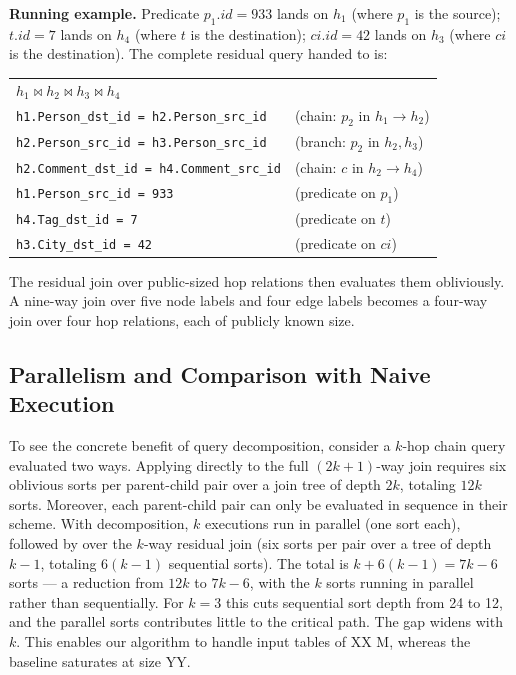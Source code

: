 \noindent\textbf{Running example.} Predicate $p_1.\mathit{id}=933$ lands
on $h_1$ (where $p_1$ is the source); $t.\mathit{id}=7$ lands on $h_4$
(where $t$ is the destination); $\mathit{ci}.\mathit{id}=42$ lands on
$h_3$ (where $\mathit{ci}$ is the destination). The complete residual
query handed to \wei is:
\begin{center}
\small
\begin{tabular}{@{}ll@{}}
$h_1 \bowtie h_2 \bowtie h_3 \bowtie h_4$ & \\[4pt]
\texttt{h1.Person\_dst\_id = h2.Person\_src\_id} & (chain: $p_2$ in $h_1{\to}h_2$)\\
\texttt{h2.Person\_src\_id = h3.Person\_src\_id} & (branch: $p_2$ in $h_2, h_3$)\\
\texttt{h2.Comment\_dst\_id = h4.Comment\_src\_id} & (chain: $c$ in $h_2{\to}h_4$)\\[4pt]
\texttt{h1.Person\_src\_id = 933} & (predicate on $p_1$)\\
\texttt{h4.Tag\_dst\_id = 7} & (predicate on $t$)\\
\texttt{h3.City\_dst\_id = 42} & (predicate on $\mathit{ci}$)\\
\end{tabular}
\end{center}
The residual
join over public-sized hop relations then evaluates them obliviously.
A nine-way join over five node labels and four edge labels becomes a
four-way join over four hop relations, each of publicly known size.

\subsection{Parallelism and Comparison with Naive Execution}
\label{sec:decomposition:parallelism}

To see the concrete benefit of query decomposition, consider a $k$-hop chain query evaluated two
ways. Applying \wei directly to the full $(2k{+}1)$-way join requires six
oblivious sorts per parent-child pair over a join tree of depth $2k$,
totaling $12k$ sorts. Moreover, each 
parent-child pair can only be evaluated in sequence in their scheme.
With decomposition, $k$ \onehop executions run in
parallel (one sort each), followed by \wei over the $k$-way residual join
(six sorts per pair over a tree of depth $k{-}1$, totaling $6(k{-}1)$
sequential sorts). The total is $k + 6(k{-}1) = 7k - 6$ sorts --- a reduction from
$12k$ to $7k{-}6$, with the $k$ \onehop sorts running in parallel rather
than sequentially. For $k=3$ this cuts sequential sort depth from 24 to 12,
and the parallel \onehop sorts contributes little to the critical path. The
gap widens with $k$. This enables our algorithm to handle input tables of XX M, whereas the baseline saturates at size YY.

